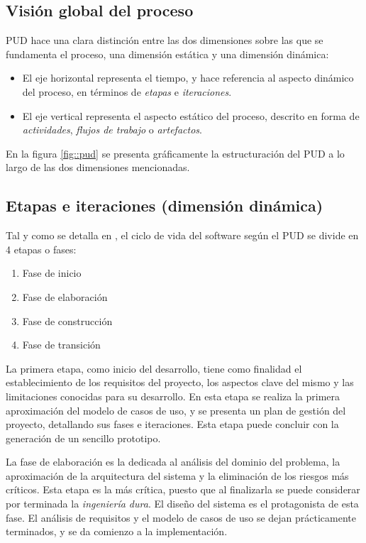 \subsection{Visión global del proceso}

\acs{PUD} hace una clara distinción entre las dos dimensiones sobre las que se fundamenta el proceso, una dimensión estática y una dimensión dinámica:

\begin{itemize}
\item El eje horizontal representa el tiempo, y hace referencia al aspecto dinámico del proceso, en términos de \emph{etapas} e \emph{iteraciones}.
\item El eje vertical representa el aspecto estático del proceso, descrito en forma de \emph{actividades}, \emph{flujos de trabajo} o \emph{artefactos}.
\end{itemize}

En la figura \ref{fig::pud} se presenta gráficamente la estructuración del \acl{PUD} a lo largo de las dos dimensiones mencionadas.

\subsection{Etapas e iteraciones (dimensión dinámica)}

Tal y como se detalla en \cite{Rational1998}, el ciclo de vida del software según el \acl{PUD} se divide en 4 etapas o fases:

\begin{enumerate}
\item Fase de inicio
\item Fase de elaboración
\item Fase de construcción
\item Fase de transición
\end{enumerate}

La primera etapa, como inicio del desarrollo, tiene como finalidad el establecimiento de los requisitos del proyecto, los aspectos clave del mismo y las limitaciones conocidas para su desarrollo. En esta etapa se realiza la primera aproximación del modelo de casos de uso, y se presenta un plan de gestión del proyecto, detallando sus fases e iteraciones. Esta etapa puede concluir con la generación de un sencillo prototipo.

La fase de elaboración es la dedicada al análisis del dominio del problema, la aproximación de la arquitectura del sistema y la eliminación de los riesgos más críticos. Esta etapa es la más crítica, puesto que al finalizarla se puede considerar por terminada la \emph{ingeniería dura}. El diseño del sistema es el protagonista de esta fase. El análisis de requisitos y el modelo de casos de uso se dejan prácticamente terminados, y se da comienzo a la implementación.

